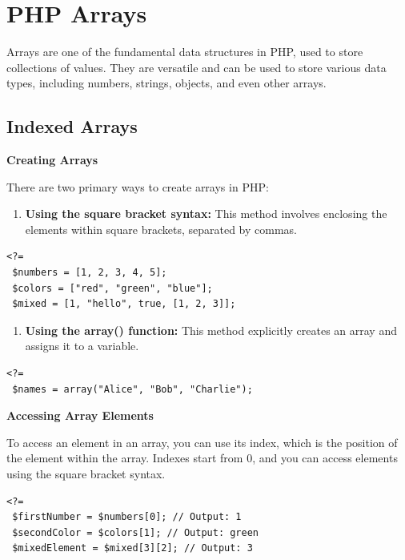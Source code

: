 \documentclass[11pt]{article}
\date{}
\title{}
\begin{document}
\setcounter{tocdepth}{3}
\tableofcontents

\setlength\parindent{10pt}

\section{PHP Arrays}
\label{sec:orgabfc312}
Arrays are one of the fundamental data structures in PHP, used to store
collections of values. They are versatile and can be used to store
various data types, including numbers, strings, objects, and even other
arrays.

\subsection{Indexed Arrays}
\label{sec:orgd2a9c9b}
\textbf{Creating Arrays}

There are two primary ways to create arrays in PHP:

\begin{enumerate}
\item \textbf{Using the square bracket syntax:} This method involves enclosing the
elements within square brackets, separated by commas.
\end{enumerate}

\begin{verbatim}
<?=
 $numbers = [1, 2, 3, 4, 5];
 $colors = ["red", "green", "blue"];
 $mixed = [1, "hello", true, [1, 2, 3]];
\end{verbatim}

\begin{enumerate}
\item \textbf{Using the array() function:} This method explicitly creates an array
and assigns it to a variable.
\end{enumerate}

\begin{verbatim}
<?=
 $names = array("Alice", "Bob", "Charlie");
\end{verbatim}

\textbf{Accessing Array Elements}

To access an element in an array, you can use its index, which is the
position of the element within the array. Indexes start from 0, and you
can access elements using the square bracket syntax.

\begin{verbatim}
<?=
 $firstNumber = $numbers[0]; // Output: 1
 $secondColor = $colors[1]; // Output: green
 $mixedElement = $mixed[3][2]; // Output: 3
\end{verbatim}
\end{document}
